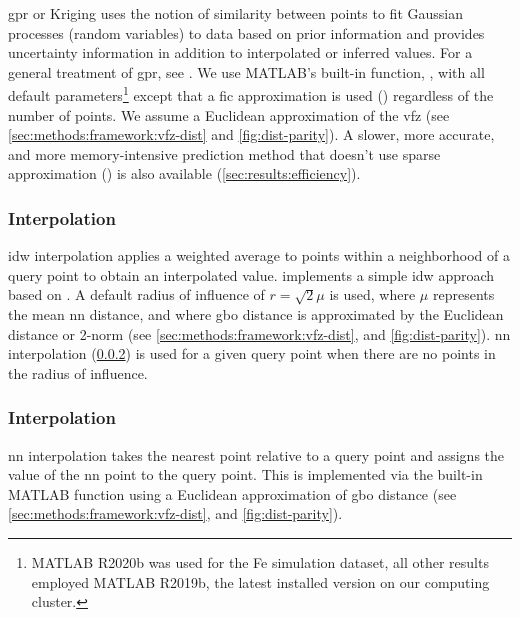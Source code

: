 \documentclass[final,twocolumn,12pt]{elsarticle}
\begin{document}
\Gls{gpr} or Kriging uses the notion of similarity between points to fit Gaussian processes (random variables) to data based on prior information and provides uncertainty information in addition to interpolated or inferred values. For a general treatment of \gls{gpr}, see \citet{rasmussenGaussianProcessesMachine2006}. We use MATLAB's built-in function, , with all default parameters\footnote{MATLAB R2020b was used for the Fe simulation dataset, all other results employed MATLAB R2019b, the latest installed version on our computing cluster.} except that a \gls{fic} approximation is used () regardless of the number of \inpt{} points. We assume a Euclidean approximation of the \gls{vfz} (see \cref{sec:methods:framework:vfz-dist} and \cref{fig:dist-parity}). A slower, more accurate, and more memory-intensive prediction method that doesn't use sparse approximation () is also available (\cref{sec:results:efficiency}). %

\subsubsection{ Interpolation}
\label{sec:methods:interp:idw}

\Gls{idw} interpolation applies a weighted average to points within a neighborhood of a query point to obtain an interpolated value.  implements a simple \gls{idw} approach based on \cite{tovarInverseDistanceWeight2020}. A default radius of influence of $r=\sqrt{2} \mu$ is used, where $\mu$ represents the mean \gls{nn} distance, and where \gls{gbo} distance is approximated by the Euclidean distance or 2-norm (see \cref{sec:methods:framework:vfz-dist}, and \cref{fig:dist-parity}). \gls{nn} interpolation (\cref{sec:methods:interp:nn}) is used for a given query point when there are no \inpt{} points in the radius of influence. %

\subsubsection{ Interpolation}
\label{sec:methods:interp:nn}

\Gls{nn} interpolation takes the nearest \inpt{} point relative to a query point and assigns the value of the \gls{nn} \inpt{} point to the query point. This is implemented via the built-in MATLAB function  using a Euclidean approximation of \gls{gbo} distance (see \cref{sec:methods:framework:vfz-dist}, and \cref{fig:dist-parity}). %
\end{document}
